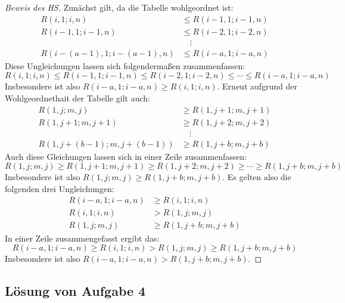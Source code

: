 \begin{proof}[Beweis des HS]
    Zunächst gilt, da die Tabelle wohlgeordnet ist:
    \begin{align*}
        R(i, 1; i, n)&\leq R(i-1, 1; i-1, n)\\
        R(i-1, 1; i-1, n)&\leq R(i-2, 1; i-2, n)\\
        &\quad\vdots\\
        R(i-(a-1), 1; i-(a-1), n)&\leq R(i-a, 1; i-a, n)
    \end{align*}
    Diese Ungleichungen lassen sich folgendermaßen zusammenfassen:
    \[
        R(i, 1; i, n)\leq R(i-1, 1; i-1, n)\leq R(i-2, 1; i-2, n)\leq\cdots\leq R(i-a, 1; i-a, n)
    \]
    Insbesondere ist also $R(i-a, 1; i-a, n)\geq R(i, 1; i, n)$. Erneut aufgrund der Wohlgeordnethait der Tabelle 
    gilt auch:
    \begin{align*}
        R(1, j; m, j)&\geq R(1, j+1; m, j+1)\\
        R(1, j+1; m, j+1)&\geq R(1, j+2; m, j+2)\\
        &\quad\vdots\\
        R(1, j+(b-1); m, j+(b-1))&\geq R(1, j+b; m, j+b)
    \end{align*}
    Auch diese Gleichungen lassen sich in einer Zeile zusammenfassen:
    \[
        R(1, j; m, j)\geq R(1, j+1; m, j+1)\geq R(1, j+2; m, j+2)\geq\cdots\geq R(1, j+b; m, j+b)
    \]
    Insbesondere ist also $R(1, j; m, j)\geq R(1, j+b; m, j+b)$. Es gelten also die folgenden drei Ungleichungen:
    \begin{align*}
        R(i-a, 1; i-a, n)&\geq R(i, 1; i, n)\\
        R(i, 1; i, n)&>R(1, j; m, j)\\
        R(1, j; m, j)&\geq R(1, j+b; m, j+b)
    \end{align*}
    In einer Zeile zusammengefasst ergibt das:
    \[
        R(i-a, 1; i-a, n)\geq R(i, 1; i, n)>R(1, j; m, j)\geq R(1, j+b; m, j+b)
    \]
    Insbesondere ist also $R(i-a, 1; i-a, n)>R(1, j+b; m, j+b)$.
\end{proof}

\subsection*{Lösung von Aufgabe 4}

